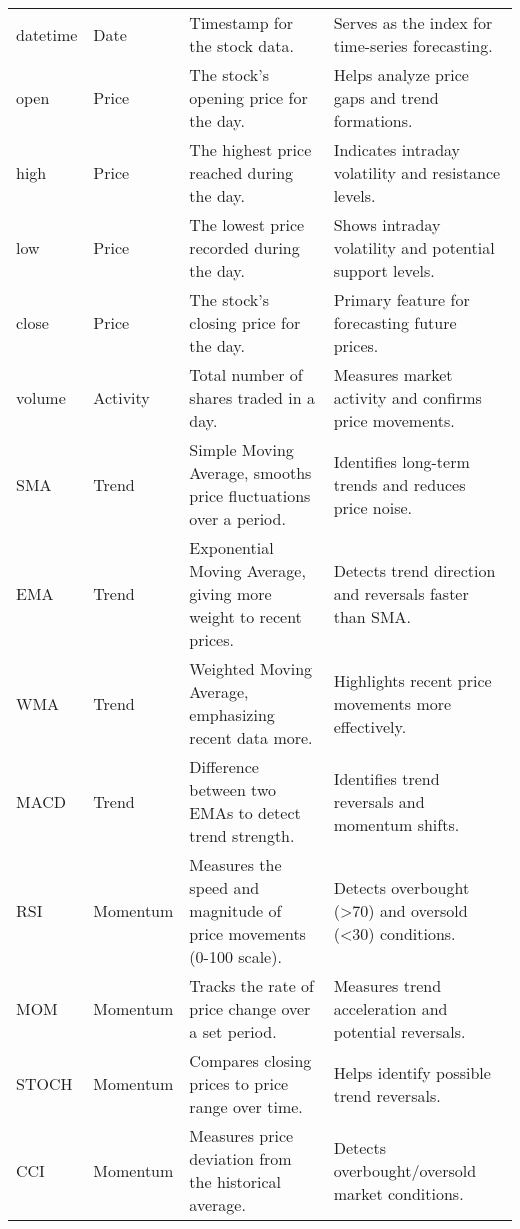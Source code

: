 \begin{longtable}{llp{5cm}p{5cm}}
    \hline
    \endlastfoot
        datetime & Date 
        & Timestamp for the stock data. 
        & Serves as the index for time-series forecasting. \\
        open & Price 
        & The stock's opening price for the day. 
        & Helps analyze price gaps and trend formations. \\
        high & Price 
        & The highest price reached during the day. 
        & Indicates intraday volatility and resistance levels. \\
        low & Price 
        & The lowest price recorded during the day. 
        & Shows intraday volatility and potential support levels. \\
        close & Price 
        & The stock's closing price for the day. & Primary feature for forecasting future prices. \\
        volume & Activity 
        & Total number of shares traded in a day. 
        & Measures market activity and confirms price movements. \\
        SMA & Trend 
        & Simple Moving Average, smooths price fluctuations over a period. 
        & Identifies long-term trends and reduces price noise. \\
        EMA & Trend 
        & Exponential Moving Average, giving more weight to recent prices. 
        & Detects trend direction and reversals faster than SMA. \\
        WMA & Trend 
        & Weighted Moving Average, emphasizing recent data more. 
        & Highlights recent price movements more effectively. \\
        MACD & Trend 
        & Difference between two EMAs to detect trend strength. 
        & Identifies trend reversals and momentum shifts. \\
        RSI 
        & Momentum 
        & Measures the speed and magnitude of price movements (0-100 scale). 
        & Detects overbought (>70) and oversold (<30) conditions. \\
        MOM & Momentum 
        & Tracks the rate of price change over a set period. 
        & Measures trend acceleration and potential reversals. \\
        STOCH & Momentum
        & Compares closing prices to price range over time. 
        & Helps identify possible trend reversals. \\
        CCI & Momentum 
        & Measures price deviation from the historical average. 
        & Detects overbought/oversold market conditions. \\

\end{longtable}
